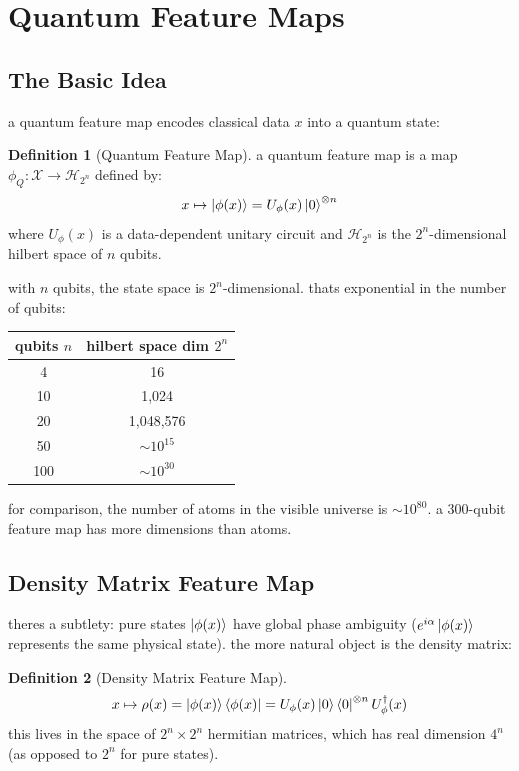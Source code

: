 \documentclass[11pt,a4paper]{article}
\theoremstyle{definition}
\newtheorem{definition}{Definition}[section]
\theoremstyle{remark}
\begin{document}
\section{Quantum Feature Maps}

\subsection{The Basic Idea}

a quantum feature map encodes classical data $x$ into a quantum state:

\begin{definition}[Quantum Feature Map]
a quantum feature map is a map $\phi_Q: \mathcal{X} \to \mathcal{H}_{2^n}$ defined by:
\[
x \mapsto \ket{\phi(x)} = U_\phi(x)\ket{0}^{\otimes n}
\]
where $U_\phi(x)$ is a data-dependent unitary circuit and $\mathcal{H}_{2^n}$ is the $2^n$-dimensional hilbert space of $n$ qubits.
\end{definition}

with $n$ qubits, the state space is $2^n$-dimensional. thats exponential in the number of qubits:
\begin{center}
\begin{tabular}{c|c}
\textbf{qubits $n$} & \textbf{hilbert space dim $2^n$} \\
\hline
4 & 16 \\
10 & 1,024 \\
20 & 1,048,576 \\
50 & $\sim 10^{15}$ \\
100 & $\sim 10^{30}$
\end{tabular}
\end{center}

for comparison, the number of atoms in the visible universe is $\sim 10^{80}$. a 300-qubit feature map has more dimensions than atoms.

\subsection{Density Matrix Feature Map}

theres a subtlety: pure states $\ket{\phi(x)}$ have global phase ambiguity ($e^{i\alpha}\ket{\phi(x)}$ represents the same physical state). the more natural object is the density matrix:

\begin{definition}[Density Matrix Feature Map]
\[
x \mapsto \rho(x) = \ket{\phi(x)}\bra{\phi(x)} = U_\phi(x)\ket{0}\bra{0}^{\otimes n} U_\phi^\dagger(x)
\]
this lives in the space of $2^n \times 2^n$ hermitian matrices, which has real dimension $4^n$ (as opposed to $2^n$ for pure states).
\end{definition}
\end{document}
